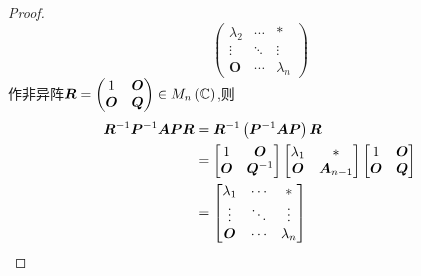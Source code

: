 {\begin{proof}
\[\begin{pmatrix}
                \lambda_2 & \cdots & *           \\
                \vdots    & \ddots & \vdots      \\
                \bm{O}    & \cdots & \lambda_{n}
            \end{pmatrix}
        \]作非异阵$
            \bm{R}=\begin{pmatrix}
                1      & \bm{O} \\
                \bm{O} & \bm{Q}
            \end{pmatrix}\in M_n\left(
            \mathbb{C}
            \right)$,则
        \begin{align*}
            \bm{R}^{-1}\bm{P}^{-1}\bm{APR} & =
            \bm{R}^{-1}\left(
            \bm{P}^{-1}\bm{A}\bm{P}
            \right)\bm{R}                                                               \\
                                           & =\begin{bmatrix}
                                                  1      & \bm{O}      \\
                                                  \bm{O} & \bm{Q}^{-1}
                                              \end{bmatrix}\begin{bmatrix}
                                                               \lambda_1 & *            \\
                                                               \bm{O}    & \bm{A}_{n-1}
                                                           \end{bmatrix}\begin{bmatrix}
                                                                            1      & \bm{O} \\
                                                                            \bm{O} & \bm{Q}
                                                                        \end{bmatrix} \\
                                           & =
            \begin{bmatrix}
                \lambda_1 & \cdots & *         \\
                \vdots    & \ddots & \vdots    \\
                \bm{O}    & \cdots & \lambda_n
            \end{bmatrix}\qedhere
        \end{align*}
    \end{proof}
}
